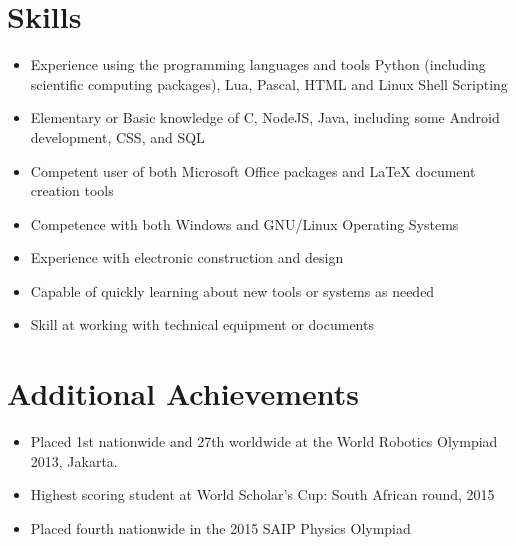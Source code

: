 \documentclass[12pt,a4paper,notitlepage]{article}
\begin{document}
\section*{Skills}
\begin{itemize}
    \item Experience using the programming languages and tools Python (including scientific computing packages), Lua, Pascal, HTML and Linux Shell Scripting
    \item Elementary or Basic knowledge of C, NodeJS, Java, including some Android development, CSS, and SQL
    \item Competent user of both Microsoft Office packages and LaTeX document creation tools
    \item Competence with both Windows and GNU/Linux Operating Systems
    \item Experience with electronic construction and design
    \item Capable of quickly learning about new tools or systems as needed
    \item Skill at working with technical equipment or documents
\end{itemize}

\section*{Additional Achievements}
\begin{itemize}
    \item Placed 1st nationwide and 27th worldwide at the World Robotics Olympiad 2013, Jakarta.
    \item Highest scoring student at World Scholar's Cup: South African round, 2015
    \item Placed fourth nationwide in the 2015 SAIP Physics Olympiad
\end{itemize}
\end{document}
